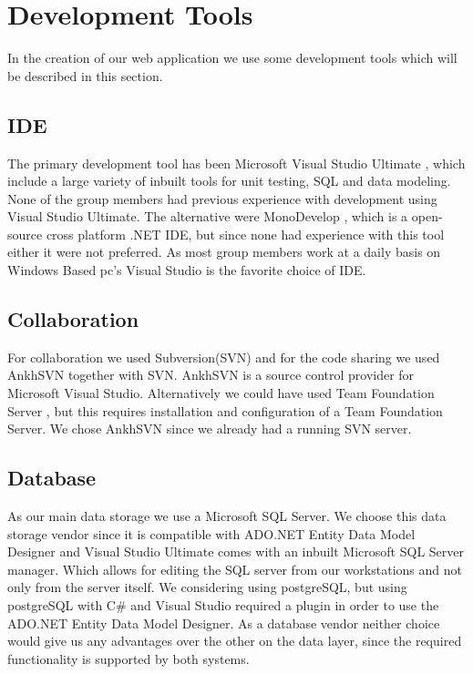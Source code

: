\section{Development Tools}
In the creation of our web application we use some development tools which will be described in this section. 

\subsection{IDE}
\label{sub:ide}
The primary development tool has been Microsoft Visual Studio Ultimate \cite{visualStudio}, which include a large variety of inbuilt tools for unit testing, SQL and data modeling. 
None of the group members had previous experience with development using Visual Studio Ultimate. The alternative were MonoDevelop \cite{mono}, which is a open-source cross platform .NET IDE, but since none had experience with this tool either it were not preferred. 
As most group members work at a daily basis on Windows Based pc's Visual Studio is the favorite choice of IDE. 



\subsection{Collaboration}
\label{sub:collaboration}
For collaboration we used Subversion(SVN) and for the code sharing we used AnkhSVN \cite{ankhsvn} together with SVN. 
AnkhSVN is a source control provider for Microsoft Visual Studio. 
Alternatively we could have used Team Foundation Server \cite{teamfoundation}, but this requires installation and configuration of a Team Foundation Server. 
We chose AnkhSVN since we already had a running SVN server. 

\subsection{Database}
\label{sub:database}
As our main data storage we use a Microsoft SQL Server. 
We choose this data storage vendor since it is compatible with ADO.NET Entity Data Model Designer and Visual Studio Ultimate comes with an inbuilt Microsoft SQL Server manager. 
Which allows for editing the SQL server from our workstations and not only from the server itself. 
We considering using postgreSQL, but using postgreSQL with C\# and Visual Studio required a plugin in order to use the ADO.NET Entity Data Model Designer. 
As a database vendor neither choice would give us any advantages over the other on the data layer, since the required functionality is supported by both systems. 